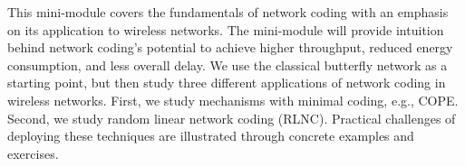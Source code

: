This mini-module covers the fundamentals of network coding with an emphasis on its application to wireless networks. The mini-module will provide intuition behind network coding's potential to achieve higher throughput, reduced energy consumption, and less overall delay. We use the classical butterfly network as a starting point, but then study three different applications of network coding in wireless networks. First, we study mechanisms with minimal coding, e.g., COPE. Second, we study random linear network coding (RLNC). Practical challenges of deploying these techniques are illustrated through concrete examples and exercises.
